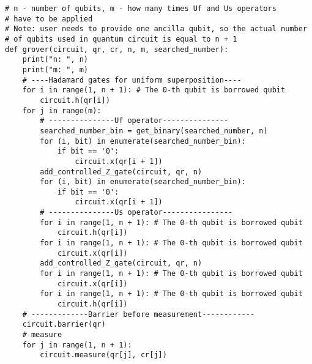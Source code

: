 \newpage
\begin{lstlisting}[frame=single]
# n - number of qubits, m - how many times Uf and Us operators 
# have to be applied
# Note: user needs to provide one ancilla qubit, so the actual number 
# of qubits used in quantum circuit is equal to n + 1
def grover(circuit, qr, cr, n, m, searched_number):
    print("n: ", n)
    print("m: ", m)
    # ----Hadamard gates for uniform superposition----
    for i in range(1, n + 1): # The 0-th qubit is borrowed qubit
        circuit.h(qr[i])
    for j in range(m):
        # ---------------Uf operator---------------
        searched_number_bin = get_binary(searched_number, n)
        for (i, bit) in enumerate(searched_number_bin):
            if bit == '0':
                circuit.x(qr[i + 1])
        add_controlled_Z_gate(circuit, qr, n)
        for (i, bit) in enumerate(searched_number_bin):
            if bit == '0':
                circuit.x(qr[i + 1])
        # ---------------Us operator----------------
        for i in range(1, n + 1): # The 0-th qubit is borrowed qubit
            circuit.h(qr[i])
        for i in range(1, n + 1): # The 0-th qubit is borrowed qubit
            circuit.x(qr[i])
        add_controlled_Z_gate(circuit, qr, n)
        for i in range(1, n + 1): # The 0-th qubit is borrowed qubit
            circuit.x(qr[i])
        for i in range(1, n + 1): # The 0-th qubit is borrowed qubit
            circuit.h(qr[i])
    # -------------Barrier before measurement------------
    circuit.barrier(qr)
    # measure
    for j in range(1, n + 1):
        circuit.measure(qr[j], cr[j])
\end{lstlisting}